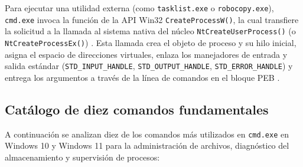 \documentclass[12pt]{article}
\begin{document}
Para ejecutar una utilidad externa (como \texttt{tasklist.exe} o \texttt{robocopy.exe}), \texttt{cmd.exe} invoca la función de la API Win32 \texttt{CreateProcessW()}, la cual transfiere la solicitud a la llamada al sistema nativa del núcleo \texttt{NtCreateUserProcess()} (o \texttt{NtCreateProcessEx()}) \parencite[\S 2.3, p.\ 52]{silberschatz2006fundamentos}. Esta llamada crea el objeto de proceso y su hilo inicial, asigna el espacio de direcciones virtuales, enlaza los manejadores de entrada y salida estándar (\texttt{STD\_INPUT\_HANDLE}, \texttt{STD\_OUTPUT\_HANDLE}, \texttt{STD\_ERROR\_HANDLE}) y entrega los argumentos a través de la línea de comandos en el bloque PEB \parencite[\S 3.2, p.\ 125]{stallings2018operating}.

\subsection{Catálogo de diez comandos fundamentales}
\label{subsec:catalogoDiezComandosWindows}

A continuación se analizan diez de los comandos más utilizados en \texttt{cmd.exe} en Windows 10 y Windows 11 para la administración de archivos, diagnóstico del almacenamiento y supervisión de procesos:
\end{document}
